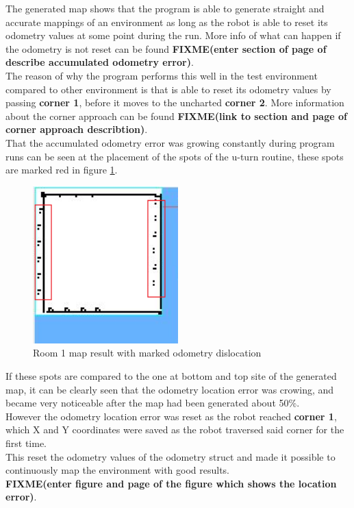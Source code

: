 The generated map shows that the program is able to generate straight and accurate mappings of an environment as long as the robot is able to reset its odometry values at some point during the run. More info of what can happen if the odometry is not reset can be found \textbf{FIXME(enter section of page of describe accumulated odometry error)}. \\
The reason of why the program performs this well in the test environment compared to other environment is that is able to reset its odometry values by passing \textbf{corner 1}, before it moves to the uncharted \textbf{corner 2}. More information about the corner approach can be found \textbf{FIXME(link to section and page of corner approach describtion)}. \\
That the accumulated odometry error was growing constantly during program runs can be seen at the placement of the spots of the u-turn routine, these spots are marked red in figure \ref{room1_empty_marked}.

\begin{figure}[h]
\centering
\includegraphics[width = 0.5\textwidth]{../../figures/room1_result_marked.png} 
\caption{Room 1 map result with marked odometry dislocation}
\label{room1_empty_marked}
\end{figure}

If these spots are compared to the one at bottom and top site of the generated map, it can be clearly seen that the odometry location error was crowing, and became very noticeable after the map had been generated about 50\%.\\[3ex]

However the odometry location error was reset as the robot reached \textbf{corner 1}, which X and Y coordinates were saved as the robot traversed said corner for the first time. \\
This reset the odometry values of the odometry struct and made it possible to continuously map the environment with good results. \\ 
\textbf{FIXME(enter figure and page of the figure which shows  the location error)}.\\[3ex]

